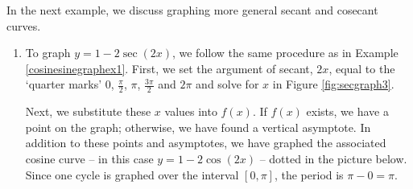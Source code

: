 \medskip

In the next example, we discuss graphing more general secant and cosecant curves.

{
\begin{enumerate}

\item  To graph $y = 1 - 2 \sec(2x)$, we follow the same procedure as in Example \ref{cosinesinegraphex1}.  First, we set the argument of secant, $2x$, equal to the `quarter marks' $0$, $\frac{\pi}{2}$, $\pi$, $\frac{3\pi}{2}$ and $2\pi$ and solve for $x$ in Figure \ref{fig:secgraph3}.


Next, we substitute these $x$ values into $f(x)$.  If $f(x)$ exists, we have a point on the graph;  otherwise, we have found a vertical asymptote.  In addition to these points and asymptotes, we have graphed the associated cosine curve -- in this case $y = 1 - 2 \cos(2x)$ -- dotted in the picture below.  Since one cycle is graphed over the interval $[0,\pi]$, the period is $\pi - 0 = \pi$.
 

\end{enumerate}}

